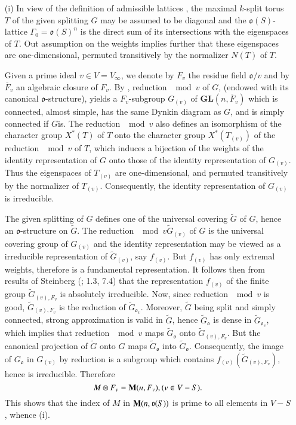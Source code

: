 \begin{itemize}
\item[(i)] In view of the definition of admissible lattices \cite{art04-key10}, the maximal $k$-split torus $T$ of the given splitting $G$ may be assumed to be diagonal and the $\mathfrak{o}(S)$-lattice $\Gamma_{0}=\mathfrak{o}(S)^{n}$ is the direct sum of its intersections with the eigenspaces of $T$. Out assumption on the weights implies further that these eigenspaces are one-dimensional, permuted transitively by the normalizer $N(T)$ of $T$.

Given a prime ideal $v\in V=V_{\infty}$, we denote by $F_{v}$ the residue field $\mathfrak{o}/v$ and by $\overline{F}_{v}$ an algebraic closure of $F_{v}$. By \cite{art04-key10}, reduction $\mod v$ of $G$, (endowed with its canonical $\mathfrak{o}$-structure), yields a $F_{v}$-subgroup $G_{(v)}$ of $\mathbf{GL}(n,\overline{F}_{v})$ which is connected, almost simple, has the same Dynkin diagram as $G$, and is simply connected if $G$\pageoriginale is. The reduction $\mod v$ also defines an isomorphism of the character group $X^{*}(T)$ of $T$ onto the character group $X^{*}(T_{(v)})$ of the reduction $\mod v$ of $T$, which induces a bijection of the weights of the identity representation of $G$ onto those of the identity representation of $G_{(v)}$. Thus the eigenspaces of $T_{(v)}$ are one-dimensional, and permuted transitively by the normalizer of $T_{(v)}$. Consequently, the identity representation of $G_{(v)}$ is irreducible.

The given splitting of $G$ defines one of the universal covering $\widetilde{G}$ of $G$, hence an $\mathfrak{o}$-structure on $\widetilde{G}$. The reduction $\mod v\widetilde{G}_{(v)}$ of $G$ is the universal covering group of $G_{(v)}$ and the identity representation may be viewed as a irreducible representation of $\widetilde{G}_{(v)}$, say $f_{(v)}$. But $f_{(v)}$ has only extremal weights, therefore is a fundamental representation. It follows then from results of Steinberg (\cite{art04-key30}; 1.3, 7.4) that the representation $f_{(v)}$ of the finite group $\widetilde{G}_{(v),F_{v}}$ is absolutely irreducible. Now, since reduction $\mod v$ is good, $\widetilde{G}_{(v),F_{v}}$ is the reduction of $\widetilde{G}_{\mathfrak{o}_{v}}$. Moreover, $\widetilde{G}$ being split and simply connected, strong approximation is valid in $\widetilde{G}$, hence $\widetilde{G}_{\mathfrak{o}}$ is dense in $\widetilde{G}_{\mathfrak{o}_{v}}$, which implies that reduction $\mod v$ maps $\widetilde{G}_{\mathfrak{o}}$ onto $\widetilde{G}_{(v),F_{v}}$. But the canonical projection of $\widetilde{G}$ onto $G$ maps $\widetilde{G}_{\mathfrak{o}}$ into $\widetilde{G}_{\mathfrak{o}}$. Consequently, the image of $G_{\mathfrak{o}}$ in $G_{(v)}$ by reduction is a subgroup which contains $f_{(v)}(\widetilde{G}_{(v),F_{v}})$, hence is irreducible. Therefore
$$
M\otimes F_{v}=\mathbf{M}(n,F_{v}), (v\in V-S).
$$
This shows that the index of $M$ in $\mathbf{M}(n,\mathfrak{o}(S))$ is prime to all elements in $V-S$, whence (i).


\end{itemize}
